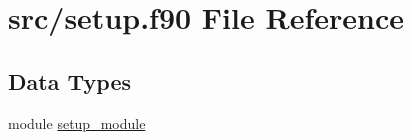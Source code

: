 \hypertarget{setup_8f90}{\section{src/setup.f90 File Reference}
\label{setup_8f90}
}
\subsection*{Data Types}
\begin{DoxyCompactItemize}
\item 
module \hyperlink{classsetup__module}{setup\-\_\-module}
\end{DoxyCompactItemize}
